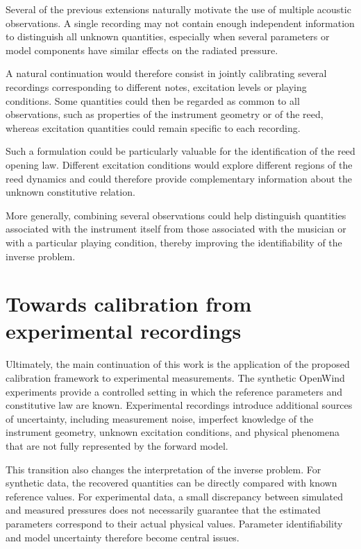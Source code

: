 \documentclass[11pt,a4paper]{report}
\theoremstyle{plain}
\theoremstyle{definition}
\begin{document}
Several of the previous extensions naturally motivate the use of multiple
acoustic observations. A single recording may not contain enough independent
information to distinguish all unknown quantities, especially when several
parameters or model components have similar effects on the radiated pressure.

A natural continuation would therefore consist in jointly calibrating several
recordings corresponding to different notes, excitation levels or playing
conditions. Some quantities could then be regarded as common to all
observations, such as properties of the instrument geometry or of the reed,
whereas excitation quantities could remain specific to each recording.

Such a formulation could be particularly valuable for the identification of
the reed opening law. Different excitation conditions would explore different
regions of the reed dynamics and could therefore provide complementary
information about the unknown constitutive relation.

More generally, combining several observations could help distinguish
quantities associated with the instrument itself from those associated with
the musician or with a particular playing condition, thereby improving the
identifiability of the inverse problem.

\section{Towards calibration from experimental recordings}

Ultimately, the main continuation of this work is the application of the
proposed calibration framework to experimental measurements. The synthetic
OpenWind experiments provide a controlled setting in which the reference
parameters and constitutive law are known. Experimental recordings introduce
additional sources of uncertainty, including measurement noise, imperfect
knowledge of the instrument geometry, unknown excitation conditions, and
physical phenomena that are not fully represented by the forward model.

This transition also changes the interpretation of the inverse problem. For
synthetic data, the recovered quantities can be directly compared with known
reference values. For experimental data, a small discrepancy between simulated
and measured pressures does not necessarily guarantee that the estimated
parameters correspond to their actual physical values. Parameter
identifiability and model uncertainty therefore become central issues.
\end{document}
